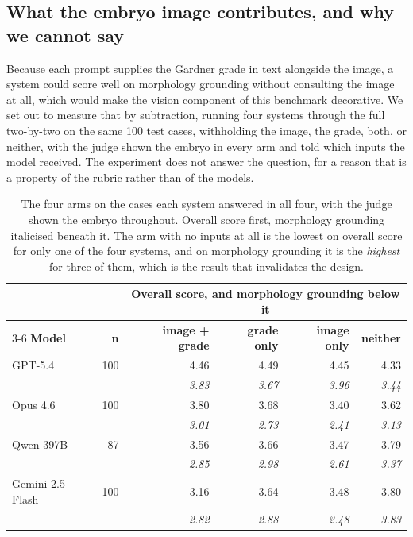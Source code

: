 \documentclass[11pt]{article}
\begin{document}
\subsection{What the embryo image contributes, and why we cannot say}
\label{sec:ablation}

Because each prompt supplies the Gardner grade in text alongside the image, a
system could score well on morphology grounding without consulting the image at
all, which would make the vision component of this benchmark decorative. We set
out to measure that by subtraction, running four systems through the full
two-by-two on the same 100 test cases, withholding the image, the grade, both, or
neither, with the judge shown the embryo in every arm and told which inputs the
model received. The experiment does not answer the question, for a reason that is
a property of the rubric rather than of the models.

\begin{table}[H]
\centering
\small
\begin{tabular}{lrrrrr}
\toprule
& & \multicolumn{4}{c}{\textbf{Overall score, and morphology grounding below it}} \\
\cmidrule(lr){3-6}
\textbf{Model} & \textbf{n} & \textbf{image + grade} & \textbf{grade only} &
\textbf{image only} & \textbf{neither} \\
\midrule
GPT-5.4          & 100 & 4.46 & 4.49 & 4.45 & 4.33 \\
                 &     & \emph{3.83} & \emph{3.67} & \emph{3.96} & \emph{3.44} \\
Opus 4.6         & 100 & 3.80 & 3.68 & 3.40 & 3.62 \\
                 &     & \emph{3.01} & \emph{2.73} & \emph{2.41} & \emph{3.13} \\
Qwen 397B        &  87 & 3.56 & 3.66 & 3.47 & 3.79 \\
                 &     & \emph{2.85} & \emph{2.98} & \emph{2.61} & \emph{3.37} \\
Gemini 2.5 Flash & 100 & 3.16 & 3.64 & 3.48 & 3.80 \\
                 &     & \emph{2.82} & \emph{2.88} & \emph{2.48} & \emph{3.83} \\
\bottomrule
\end{tabular}
\caption{The four arms on the cases each system answered in all four, with the
judge shown the embryo throughout. Overall score first, morphology grounding
italicised beneath it. The arm with no inputs at all is the lowest on overall
score for only one of the four systems, and on morphology grounding it is the
\emph{highest} for three of them, which is the result that invalidates the
design.}
\label{tab:ablation}
\end{table}
\end{document}

